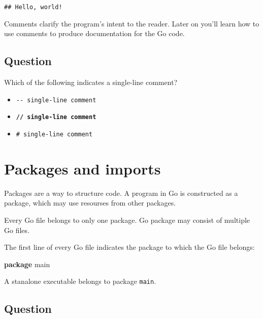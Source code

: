 \documentclass[]{book}
\newenvironment{Shaded}{\begin{snugshade}}{\end{snugshade}}
\newcommand{\KeywordTok}[1]{\textcolor[rgb]{0.13,0.29,0.53}{\textbf{#1}}}
\newcommand{\NormalTok}[1]{#1}
\providecommand{\tightlist}{%
  \setlength{\itemsep}{0pt}\setlength{\parskip}{0pt}}
\let\BeginKnitrBlock\begin \let\EndKnitrBlock\end
\begin{document}
\begin{verbatim}
## Hello, world!
\end{verbatim}

\BeginKnitrBlock{rmdnote}
Comments clarify the program's intent to the reader. Later on you'll learn
how to use comments to produce documentation for the Go code.
\EndKnitrBlock{rmdnote}

\hypertarget{question-16}{%
\subsection*{Question}\label{question-16}}

Which of the following indicates a single-line comment?

\begin{itemize}
\tightlist
\item
  \texttt{-\/-\ single-line\ comment}
\item
  \textbf{\texttt{//\ single-line\ comment}}
\item
  \texttt{\#\ single-line\ comment}
\end{itemize}

\hypertarget{packages-and-imports}{%
\section{Packages and imports}\label{packages-and-imports}}

Packages are a way to structure code. A program in Go is constructed as a
package, which may use resourses from other packages.

Every Go file belongs to only one package. Go package may consist of multiple
Go files.

The first line of every Go file indicates the package to which the Go file
belongs:

\begin{Shaded}
\begin{Highlighting}[]
\KeywordTok{package}\NormalTok{ main}
\end{Highlighting}
\end{Shaded}

A stanalone executable belongs to package \texttt{main}.

\hypertarget{question-17}{%
\subsection*{Question}\label{question-17}}
\end{document}

